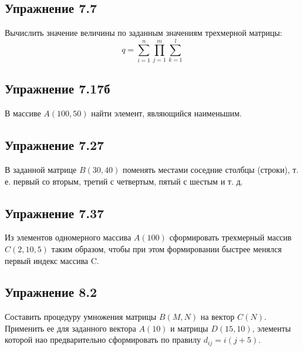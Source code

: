 \documentclass[12pt,a4paper]{scrartcl}
\begin{document}
\subsection*{Упражнение 7.7}
\noindent
Вычислить значение величины по заданным значениям трехмерной матрицы: $$q = \sum_{i=1}^{n} \prod_{j=1}^{m} \sum_{k=1}^{l}$$
\subsection*{Упражнение 7.17б}
\noindent
В массиве $A(100,50)$ найти элемент, являющийся наименьшим.    
\subsection*{Упражнение 7.27}
\noindent
В заданной матрице $B(30,40)$ поменять местами соседние столбцы (строки), т. е. первый со вторым, третий с четвертым, пятый с шестым и т. д.
\subsection*{Упражнение 7.37}
\noindent
Из элементов одномерного массива $A(100)$ сформировать трехмерный массив  $C(2,10,5)$ таким образом, чтобы при этом формировании быстрее менялся первый индекс массива C.

\subsection*{Упражнение 8.2}
\noindent
Составить процедуру умножения матрицы $B(M, N)$ на вектор $C(N)$. Применить ее для заданного вектора $A(10)$ и матрицы $D(15,10)$, элементы которой нао предварительно сформировать по правилу $d_{ij}=i(j+5)$.
\end{document}
